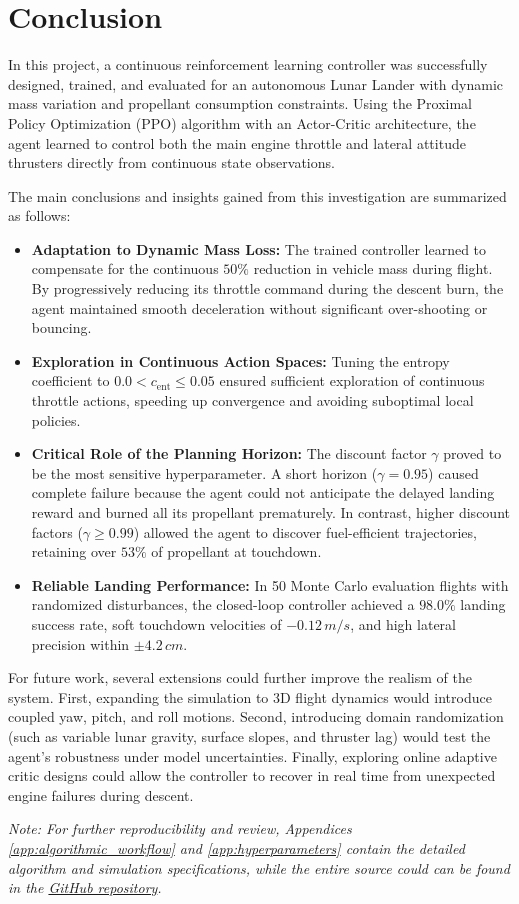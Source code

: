 \section{Conclusion}
\label{sec:conclusion}

In this project, a continuous reinforcement learning controller was successfully designed, trained, and evaluated for an autonomous Lunar Lander with dynamic mass variation and propellant consumption constraints. Using the Proximal Policy Optimization (PPO) algorithm with an Actor-Critic architecture, the agent learned to control both the main engine throttle and lateral attitude thrusters directly from continuous state observations.

The main conclusions and insights gained from this investigation are summarized as follows:
\begin{itemize}[leftmargin=*,label=$\bullet$]
    \item \textbf{Adaptation to Dynamic Mass Loss:} The trained controller learned to compensate for the continuous $50\%$ reduction in vehicle mass during flight. By progressively reducing its throttle command during the descent burn, the agent maintained smooth deceleration without significant over-shooting or bouncing.
    \item \textbf{Exploration in Continuous Action Spaces:} Tuning the entropy coefficient to $0.0 < c_{\text{ent}} \leq 0.05$ ensured sufficient exploration of continuous throttle actions, speeding up convergence and avoiding suboptimal local policies.
    \item \textbf{Critical Role of the Planning Horizon:} The discount factor $\gamma$ proved to be the most sensitive hyperparameter. A short horizon ($\gamma = 0.95$) caused complete failure because the agent could not anticipate the delayed landing reward and burned all its propellant prematurely. In contrast, higher discount factors ($\gamma \ge 0.99$) allowed the agent to discover fuel-efficient trajectories, retaining over $53\%$ of propellant at touchdown.
    \item \textbf{Reliable Landing Performance:} In 50 Monte Carlo evaluation flights with randomized disturbances, the closed-loop controller achieved a $98.0\%$ landing success rate, soft touchdown velocities of $-0.12\,\si{m/s}$, and high lateral precision within $\pm 4.2\,\si{cm}$.
\end{itemize}

For future work, several extensions could further improve the realism of the system. First, expanding the simulation to 3D flight dynamics would introduce coupled yaw, pitch, and roll motions. Second, introducing domain randomization (such as variable lunar gravity, surface slopes, and thruster lag) would test the agent's robustness under model uncertainties. Finally, exploring online adaptive critic designs could allow the controller to recover in real time from unexpected engine failures during descent.

\emph{Note: For further reproducibility and review, Appendices \ref{app:algorithmic_workflow} and \ref{app:hyperparameters} contain the detailed algorithm and simulation specifications, while the entire source could can be found in the \href{https://github.com/acrausvidal/BioInspired_2026_lander_project}{GitHub repository}.}
